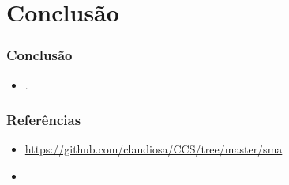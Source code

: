 \documentclass[10pt]{beamer}
\begin{document}

\section{Conclusão}
\begin{frame}
    \frametitle{Conclusão}
    \begin{itemize}
    \item .
    \end{itemize}
\end{frame}


\begin{frame}
    \frametitle{Referências}
    \begin{itemize}
     \item \url{https://github.com/claudiosa/CCS/tree/master/sma}
     \item \url{}
    \end{itemize}
\end{frame}

\end{document}
